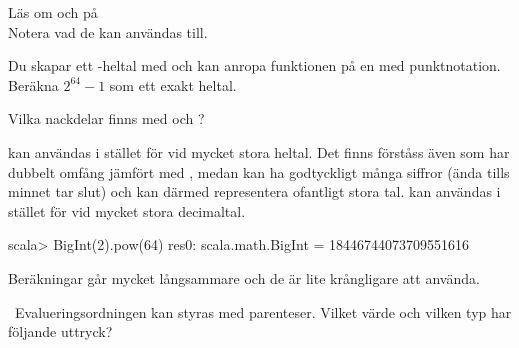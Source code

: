 \Subtask Läs om  och  på \Scaladoc \\ Notera vad de kan användas till.

\Subtask Du skapar ett -heltal med  och kan anropa funktionen  på en  med punktnotation. Beräkna $2^{64} -1$ som ett exakt heltal.

\Subtask Vilka nackdelar finns med  och ?

\SOLUTION

\TaskSolved \what

\SubtaskSolved {} kan användas i stället för  vid mycket stora heltal. Det finns förståss även  som har dubbelt omfång jämfört med , medan  kan ha godtyckligt många siffror (ända tills minnet tar slut) och kan därmed representera ofantligt stora tal.  kan användas i stället för  vid mycket stora decimaltal.

\SubtaskSolved
\begin{REPL}
scala> BigInt(2).pow(64)
res0: scala.math.BigInt = 18446744073709551616
\end{REPL}

\SubtaskSolved Beräkningar går mycket långsammare och de är lite krångligare att använda.

\QUESTEND






\QUESTBEGIN

\Task \what~Evalueringsordningen kan styras med parenteser. Vilket värde och vilken typ har följande uttryck?

\Subtask {}

\Subtask {}

\Subtask {}

\SOLUTION

\TaskSolved \what

\SubtaskSolved {}

\SubtaskSolved {}

\SubtaskSolved {}

\QUESTEND




\QUESTBEGIN

